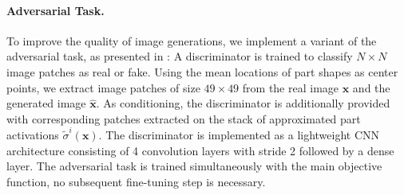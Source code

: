 \paragraph{Adversarial Task.}
	To improve the quality of image generations, we implement a variant of the adversarial task, as presented in \cite{isola17image2image}: A discriminator is trained to classify $N \times N$ image patches as real or fake.
	Using the mean locations of part shapes as center points, we extract image patches of size $49 \times 49$ from the real image $\mathbf{x}$ and the generated image $\hat{\mathbf{x}}$. As conditioning, the discriminator is additionally provided with corresponding patches extracted on the stack of approximated part activations $\tilde{\sigma}^i(\mathbf{x})$. The discriminator is implemented as a lightweight CNN architecture consisting of 4 convolution layers with stride 2 followed by a dense layer.
	The adversarial task is trained simultaneously with the main objective function, no subsequent fine-tuning step is necessary.
